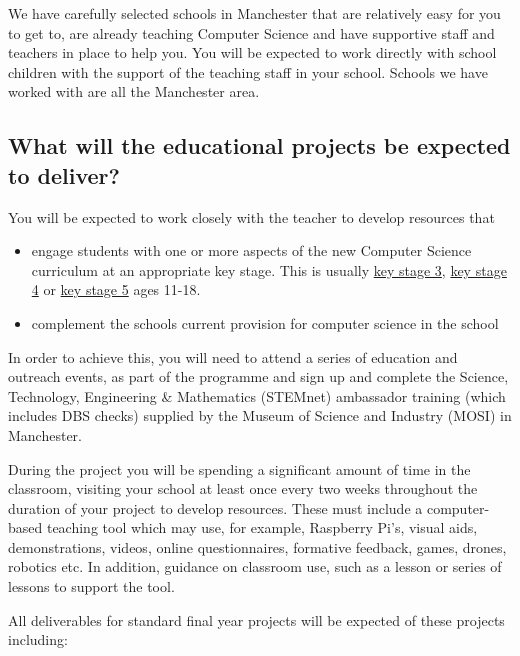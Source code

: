 \documentclass[12pt,]{book}
\providecommand{\tightlist}{%
  \setlength{\itemsep}{0pt}\setlength{\parskip}{0pt}}
\begin{document}
We have carefully selected schools in Manchester that are relatively easy for you to get to, are already teaching Computer Science and have supportive staff and teachers in place to help you. You will be expected to work directly with school children with the support of the teaching staff in your school. Schools we have worked with are all the Manchester area.

\hypertarget{what-will-the-educational-projects-be-expected-to-deliver}{%
\subsection{What will the educational projects be expected to deliver?}\label{what-will-the-educational-projects-be-expected-to-deliver}}

You will be expected to work closely with the teacher to develop resources that

\begin{itemize}
\tightlist
\item
  engage students with one or more aspects of the new Computer Science curriculum at an appropriate key stage. This is usually \href{https://en.wikipedia.org/wiki/Key_Stage_3}{key stage 3}, \href{https://en.wikipedia.org/wiki/Key_Stage_4}{key stage 4} or \href{https://en.wikipedia.org/wiki/Key_Stage_5}{key stage 5} ages 11-18.
\item
  complement the schools current provision for computer science in the school
\end{itemize}

In order to achieve this, you will need to attend a series of education and outreach events, as part of the programme and sign up and complete the Science, Technology, Engineering \& Mathematics (STEMnet) ambassador training (which includes DBS checks) supplied by the Museum of Science and Industry (MOSI) in Manchester.

During the project you will be spending a significant amount of time in the classroom, visiting your school at least once every two weeks throughout the duration of your project to develop resources. These must include a computer-based teaching tool which may use, for example, Raspberry Pi's, visual aids, demonstrations, videos, online questionnaires, formative feedback, games, drones, robotics etc. In addition, guidance on classroom use, such as a lesson or series of lessons to support the tool.

All deliverables for standard final year projects will be expected of these projects including:
\end{document}
